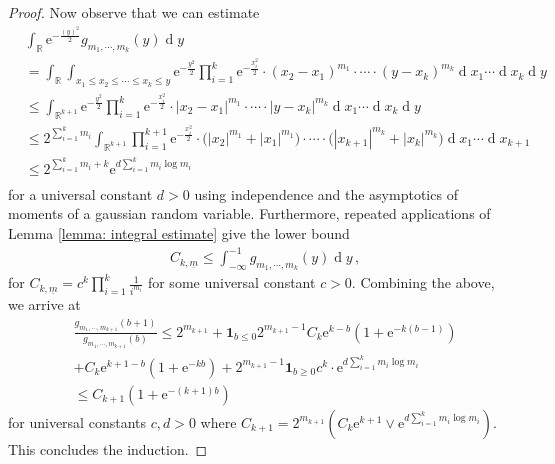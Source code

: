\documentclass[10pt,a4paper]{amsart}
\newcommand{\R}{\ensuremath{\mathbb{R}}}
\newcommand{\diff}{\ensuremath{\operatorname{d}\!}}
\begin{document}
\begin{proof}
    Now observe that we can estimate
    \begin{equation*}
    \begin{array}{cc}
        &\displaystyle\int_{\R}\mathrm{e}^{-\frac{(y)^2}{2}} g_{m_1, \cdots, m_{k}}(y)\diff y\\
        & = \displaystyle \int_{\R}\int_{x_1\le x_2\le \cdots\le x_k\le y}\mathrm{e}^{-\frac{y^2}{2}}\prod_{i=1}^{k}\mathrm{e}^{-\frac{x_i^2}{2}}\cdot(x_2-x_1)^{m_1}\cdot \cdots \cdot (y-x_k)^{m_k}\diff x_1\cdots \diff x_{k}\diff y\\
        & \le \displaystyle \int_{\R^{k+1}}\mathrm{e}^{-\frac{y^2}{2}}\prod_{i=1}^{k}\mathrm{e}^{-\frac{x_i^2}{2}}\cdot|x_2-x_1|^{m_1}\cdot \cdots \cdot |y-x_k|^{m_k}\diff x_1\cdots \diff x_{k}\diff y\\
        & \le 2^{\sum_{i=1}^k m_i }\displaystyle \int_{\R^{k+1}}\prod_{i=1}^{k+1}\mathrm{e}^{-\frac{x_i^2}{2}}\cdot\big(|x_2|^{m_1}+|x_1|^{m_1}\big)\cdot \cdots \cdot \big(|x_{k+1}|^{m_k}+|x_k|^{m_k}\big)\diff x_1\cdots \diff x_{k+1}\\
        & \le 2^{\sum_{i=1}^k m_i + k}\mathrm{e}^{d\sum_{i=1}^k m_i\log m_i}\\
    \end{array}
    \end{equation*}
    for a universal constant $d>0$ using independence and the asymptotics of moments of a gaussian random variable. Furthermore, repeated applications of Lemma \ref{lemma: integral estimate} give the lower bound 
    \begin{equation*}
    \begin{array}{cc}
          &C_{k, \underline{m}}\le \displaystyle\int^{-1}_{-\infty}g_{m_1, \cdots, m_{k}}(y) \diff y\,,
    \end{array}
    \end{equation*}
for $C_{k, \underline{m}} = c^k\prod_{i=1}^k\frac{1}{i^{m_{i}}}$ for some universal constant $c>0$. Combining the above, we arrive at
\begin{equation*}
\begin{array}{cc}
     & \frac{g_{m_1, \cdots, m_{k+1}}(b+1)}{g_{m_1, \cdots, m_{k+1}}(b)}\le 2^{m_{k+1}} + \mathbf{1}_{b\le 0}2^{m_{k+1}-1}C_k\mathrm{e}^{k-b} (1+\mathrm{e}^{-k(b-1)})\\
     & +C_k\mathrm{e}^{k+1-b} (1+\mathrm{e}^{-kb}) + 2^{m_{k+1}-1}\mathbf{1}_{b\ge 0}c^k \cdot \mathrm{e}^{d\sum_{i=1}^k m_i\log m_i} \\
     & \le C_{k+1}(1+\mathrm{e}^{-(k+1)b})
\end{array}
\end{equation*}
    for universal constants $c,d>0$ where $C_{k+1} = 2^{m_{k+1}}(C_{k}\mathrm{e}^{k+1}\lor \mathrm{e}^{d\sum_{i=1}^k m_i\log m_i})$. This concludes the induction.
\end{proof}
\end{document}
